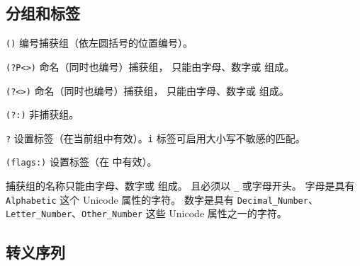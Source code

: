 \documentclass[class=article,openany]{cusdoc}[2025/10/10]
\begin{document}
\subsection{分组和标签}

\begin{regexsyntax}
  \item[\texttt{(\meta{exp})}] 编号捕获组（依左圆括号的位置编号）。
  \item[\texttt{(?P<\meta{name}>\meta{exp})}] 命名（同时也编号）捕获组， 只能由字母、数字或 \texttt{} 组成。
  \item[\texttt{(?<\meta{name}>\meta{exp})}] 命名（同时也编号）捕获组， 只能由字母、数字或 \texttt{} 组成。
  \item[\texttt{(?:\meta{exp})}] 非捕获组。
  \item[\texttt{?\meta{flags}}] 设置标签（在当前组中有效）。\texttt{i} 标签可启用大小写不敏感的匹配。
  \item[\texttt{(flags:\meta{exp})}] 设置标签（在  中有效）。
\end{regexsyntax}

捕获组的名称只能由字母、数字或 \texttt{} 组成。
且必须以 \texttt{\_} 或字母开头。
字母是具有 \texttt{Alphabetic} 这个 Unicode 属性的字符。
数字是具有 \texttt{Decimal_Number}、\texttt{Letter_Number}、\texttt{Other_Number} 这些 Unicode 属性之一的字符。

\subsection{转义序列}
\end{document}
